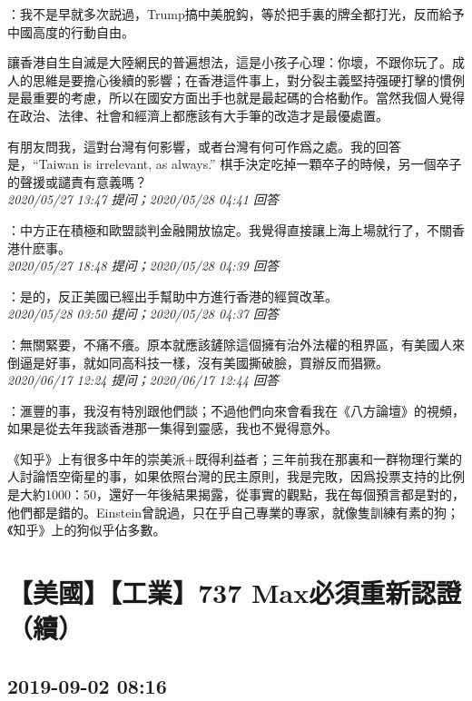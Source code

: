\documentclass[twocolumn]{ctexart}
\begin{document}
：我不是早就多次説過，Trump搞中美脫鈎，等於把手裏的牌全都打光，反而給予中國高度的行動自由。

讓香港自生自滅是大陸網民的普遍想法，這是小孩子心理：你壞，不跟你玩了。成人的思維是要擔心後續的影響；在香港這件事上，對分裂主義堅持强硬打擊的慣例是最重要的考慮，所以在國安方面出手也就是最起碼的合格動作。當然我個人覺得在政治、法律、社會和經濟上都應該有大手筆的改造才是最優處置。

有朋友問我，這對台灣有何影響，或者台灣有何可作爲之處。我的回答是，“Taiwan is irrelevant, as always.” 棋手決定吃掉一顆卒子的時候，另一個卒子的聲援或譴責有意義嗎？
\\

\textit{\hfill\noindent\small 2020/05/27 13:47 提问；2020/05/28 04:41 回答}

：中方正在積極和歐盟談判金融開放協定。我覺得直接讓上海上場就行了，不關香港什麽事。
\\

\textit{\hfill\noindent\small 2020/05/27 18:48 提问；2020/05/28 04:39 回答}

：是的，反正美國已經出手幫助中方進行香港的經貿改革。
\\

\textit{\hfill\noindent\small 2020/05/28 03:50 提问；2020/05/28 04:37 回答}

：無關緊要，不痛不癢。原本就應該鏟除這個擁有治外法權的租界區，有美國人來倒逼是好事，就如同高科技一樣，沒有美國撕破臉，買辦反而猖獗。
\\

\textit{\hfill\noindent\small 2020/06/17 12:24 提问；2020/06/17 12:44 回答}

：滙豐的事，我沒有特別跟他們談；不過他們向來會看我在《八方論壇》的視頻，如果是從去年我談香港那一集得到靈感，我也不覺得意外。

《知乎》上有很多中年的崇美派+既得利益者；三年前我在那裏和一群物理行業的人討論悟空衛星的事，如果依照台灣的民主原則，我是完敗，因爲投票支持的比例是大約1000：50，還好一年後結果揭露，從事實的觀點，我在每個預言都是對的，他們都是錯的。Einstein曾說過，只在乎自己專業的專家，就像隻訓練有素的狗；《知乎》上的狗似乎佔多數。
\\


\section{【美國】【工業】737 Max必須重新認證（續）}
\subsection{2019-09-02 08:16}
\end{document}
